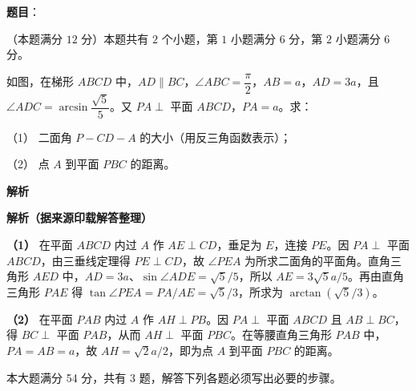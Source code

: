\begin{answer}

\textbf{题目}：

（本题满分 $12$ 分）本题共有 $2$ 个小题，第 $1$ 小题满分 $6$ 分，第 $2$ 小题满分 $6$ 分。

如图，在梯形 $ABCD$ 中，$AD\parallel BC$，$\angle ABC=\dfrac\pi2$，$AB=a$，$AD=3a$，且 $\angle ADC=\arcsin\dfrac{\sqrt5}{5}$。又 $PA\perp$ 平面 $ABCD$，$PA=a$。求：
\nopagebreak[4]
\begin{center}\end{center}
\nopagebreak[4]
（1） 二面角 $P-CD-A$ 的大小（用反三角函数表示）；

（2） 点 $A$ 到平面 $PBC$ 的距离。

\textbf{解析}

\textbf{解析（据来源印载解答整理）}
\nopagebreak[4]
\begin{center}\end{center}
\nopagebreak[4]
\textbf{（1）} 在平面 $ABCD$ 内过 $A$ 作 $AE\perp CD$，垂足为 $E$，连接 $PE$。因 $PA\perp$ 平面 $ABCD$，由三垂线定理得 $PE\perp CD$，故 $\angle PEA$ 为所求二面角的平面角。直角三角形 $AED$ 中，$AD=3a$、$\sin\angle ADE=\sqrt5/5$，所以 $AE=3\sqrt5a/5$。再由直角三角形 $PAE$ 得 $\tan\angle PEA=PA/AE=\sqrt5/3$，所求为 $\arctan(\sqrt5/3)$。

\textbf{（2）} 在平面 $PAB$ 内过 $A$ 作 $AH\perp PB$。因 $PA\perp$ 平面 $ABCD$ 且 $AB\perp BC$，得 $BC\perp$ 平面 $PAB$，从而 $AH\perp$ 平面 $PBC$。在等腰直角三角形 $PAB$ 中，$PA=AB=a$，故 $AH=\sqrt2a/2$，即为点 $A$ 到平面 $PBC$ 的距离。



\end{answer}

本大题满分 54 分，共有 3 题，解答下列各题必须写出必要的步骤。


